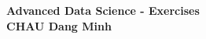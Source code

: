 \begin{center}
  \bf
  \vspace{0.9cm}
  Advanced Data Science - Exercises\\
  \vspace{0.2cm}
  CHAU Dang Minh

\end{center}
